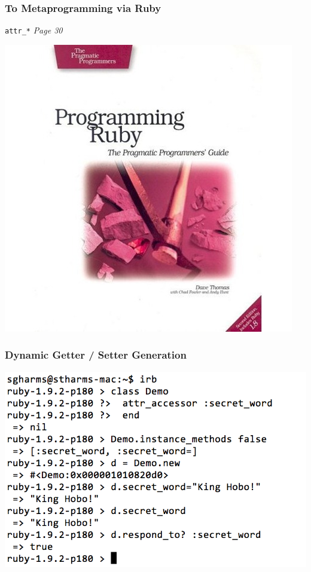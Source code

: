\documentclass[slidestop,compress,mathserif]{beamer}
\begin{document}
\begin{frame} \frametitle{To Metaprogramming via Ruby}
	\texttt{attr\_*} \emph{Page 30}
	\vskip 0.5cm
	\begin{center}
		\includegraphics[scale=0.45]{img/ruby_pickaxe.jpg}
	\end{center}
\end{frame}

\begin{frame}
	\frametitle{Dynamic Getter / Setter Generation}
	\includegraphics[scale=0.45]{img/attr_demo_1.png}
\end{frame}
\end{document}
